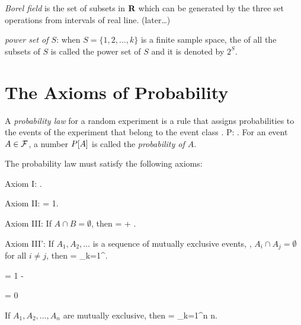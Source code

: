 	\eit

	\item \emph{Borel field} is the set of subsets in ${\mbox{\bf R}}$
	which can be generated by the three set operations from intervals of real line. (later\ldots)
	\item \emph{power set of $S$}: when $S=\{1,2,\ldots,k\}$ is a finite sample space,
	the of all the subsets of $S$ is called the power set of $S$ and
	it is denoted by $2^S$.

	\item {}
\eit

\section{The Axioms of Probability}
\bit
	\item A \emph{probability law} for a random experiment
	is a rule that assigns probabilities to the events
	of the experiment that belong to the event class \evcl.
	\beq
		P: \evcl \to \preals.
	\eeq
	For an event $A \in \mathcal{F}$, a number $P[A]$ is called the \emph{probability of $A$}.

	\item The probability law must satisfy the following axioms:
	\bit
		\item Axiom I:   . \eeql
		\item Axiom II:   = 1.\eeql
		\item Axiom III: If $A \cap B = \emptyset$, then
			  =  + . \eeql
		\item Axiom III': If $A_1,A_2, \ldots$ is a sequence of mutually exclusive events,
			\ie, $A_i \cap A_j = \emptyset$ for all $i\neq j$, then
				 = \sum_{k=1}^\infty {}.
			\eeql

	\eit
\eit

\begin{coro}
	\beq {} = 1 -  \eeq
\end{coro}

\begin{coro}
	\beq {}  \eeq
\end{coro}

\begin{coro}
	\beq \pr{\emptyset} = 0  \eeq
\end{coro}

\begin{coro}
\label{coro-finite-me}
	If $A_1,A_2,\ldots,A_n$ are mutually exclusive, then
	\beq {} = \sum_{k=1}^n  \mfor n. \eeq
\end{coro}

